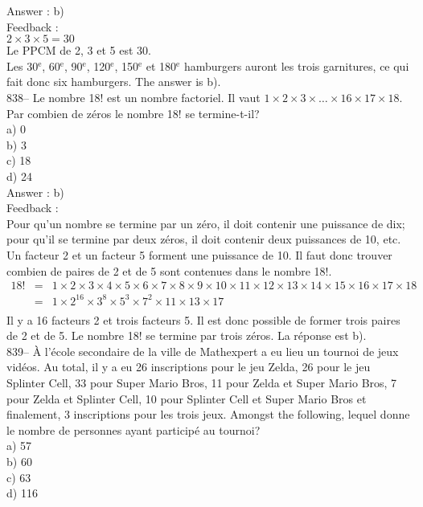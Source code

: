 ﻿\documentclass[letterpaper, 12pt]{article}
\begin{document}
Answer : b)\\

Feedback : \\
$2\times3\times5=30$\\
Le PPCM de 2, 3 et 5 est 30.  \\
Les 30$^{\textrm{e}}$, 60$^{\textrm{e}}$, 90$^{\textrm{e}}$,
120$^{\textrm{e}}$, 150$^{\textrm{e}}$ et 180$^{\textrm{e}}$
hamburgers auront  les trois garnitures, ce qui fait donc six hamburgers.
The answer is b).\\

838-- Le nombre 18! est un nombre factoriel.  Il vaut
$1\times2\times3\times\ldots\times16\times17\times18$.  Par combien
de
z\'eros le nombre 18! se termine-t-il?\\
a) 0\\
b) 3\\
c) 18\\
d) 24\\

Answer : b)\\

Feedback : \\
Pour qu'un nombre se termine par un z\'ero, il doit contenir une
puissance de dix; pour qu'il se termine par deux z\'eros, il doit
contenir deux puissances de 10, etc.  Un facteur 2 et un facteur 5
forment une puissance de 10.  Il faut donc trouver combien de paires
de 2 et de 5 sont contenues dans le nombre 18!.
\begin{eqnarray*}
18!
&=&1\times2\times3\times4\times5\times6\times7\times8\times9\times10\times11\times12\times13\times14\times15\times16\times17\times18\\[2mm]
&=&1\times2^{16}\times3^{8}\times5^{3}\times7^{2}\times11\times13\times17\\[2mm]
\end{eqnarray*}
Il y a 16 facteurs 2 et trois facteurs 5.  Il est donc possible de former
trois paires de 2 et de 5.  Le nombre 18! se termine par trois z\'eros.  La
r\'eponse est b).\\

839-- \`A l'\'ecole secondaire de la ville de Mathexpert a eu lieu un
tournoi de jeux vid\'eos.  Au total, il y a  eu 26 inscriptions pour le jeu
Zelda, 26 pour le jeu Splinter Cell, 33 pour Super Mario Bros, 11 pour Zelda
et Super Mario Bros, 7 pour Zelda et Splinter Cell,  10 pour Splinter Cell
et Super Mario Bros et finalement, 3 inscriptions pour les trois jeux.
Amongst the following, lequel donne le nombre de personnes ayant
particip\'e au tournoi?\\
a) 57\\
b) 60\\
c) 63\\
d) 116\\
\end{document}
